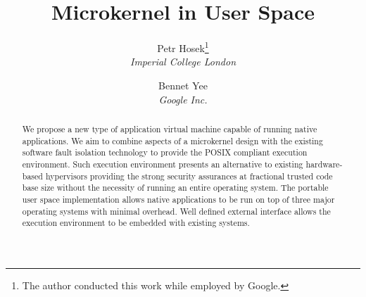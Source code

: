 \documentclass[twocolumn,10pt]{article}
\begin{document}
\title{\bf Microkernel in User Space}
\author{
Petr Hosek\footnote{The author conducted this work while employed by
Google.}\\\textit{Imperial College London}
\and Bennet Yee\\\textit{Google Inc.}
}
\date{}
\maketitle
\thispagestyle{empty}

\begin{abstract}
We propose a new type of application virtual machine capable of running
native applications. We aim to combine aspects of a microkernel design
with the existing software fault isolation technology to provide the
POSIX compliant execution environment. Such execution environment
presents an alternative to existing hardware-based hypervisors providing
the strong security assurances at fractional trusted code base size
without the necessity of running an entire operating system. The
portable user space implementation allows native applications to be run
on top of three major operating systems with minimal overhead. Well
defined external interface allows the execution environment to be
embedded with existing systems.




\end{abstract}







{
  
  
}
\end{document}
